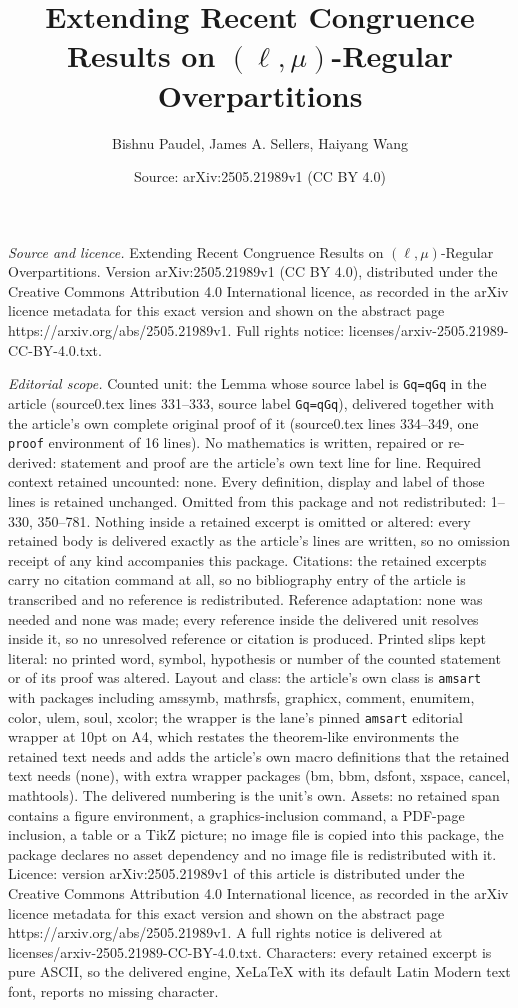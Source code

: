 \documentclass[10pt,a4paper]{amsart}
\title[Extending Recent Congruence Results on $(\ell,\mu)$-Regular ]{Extending Recent Congruence Results on $(\ell,\mu)$-Regular Overpartitions}
\author{Bishnu Paudel, James A. Sellers, Haiyang Wang}
\date{Source: arXiv:2505.21989v1 (CC BY 4.0)}
\begin{document}
\maketitle

\noindent\emph{Source and licence.} Extending Recent Congruence Results on $(\ell,\mu)$-Regular Overpartitions. Version arXiv:2505.21989v1 (CC BY 4.0), distributed under the Creative Commons Attribution 4.0 International licence, as recorded in the arXiv licence metadata for this exact version and shown on the abstract page https://arxiv.org/abs/2505.21989v1. Full rights notice: licenses/arxiv-2505.21989-CC-BY-4.0.txt.\par\smallskip

\noindent\textit{Editorial scope.} Counted unit: the Lemma whose source label is \texttt{Gq=qGq} in the article (source0.tex lines 331--333, source label \texttt{Gq=qGq}), delivered together with the article's own complete original proof of it (source0.tex lines 334--349, one \texttt{proof} environment of 16 lines). No mathematics is written, repaired or re-derived: statement and proof are the article's own text line for line. Required context retained uncounted: none. Every definition, display and label of those lines is retained unchanged. Omitted from this package and not redistributed: 1--330, 350--781. Nothing inside a retained excerpt is omitted or altered: every retained body is delivered exactly as the article's lines are written, so no omission receipt of any kind accompanies this package. Citations: the retained excerpts carry no citation command at all, so no bibliography entry of the article is transcribed and no reference is redistributed. Reference adaptation: none was needed and none was made; every reference inside the delivered unit resolves inside it, so no unresolved reference or citation is produced. Printed slips kept literal: no printed word, symbol, hypothesis or number of the counted statement or of its proof was altered. Layout and class: the article's own class is \texttt{amsart} with packages including amssymb, mathrsfs, graphicx, comment, enumitem, color, ulem, soul, xcolor; the wrapper is the lane's pinned \texttt{amsart} editorial wrapper at 10pt on A4, which restates the theorem-like environments the retained text needs and adds the article's own macro definitions that the retained text needs (none), with extra wrapper packages (bm, bbm, dsfont, xspace, cancel, mathtools). The delivered numbering is the unit's own. Assets: no retained span contains a figure environment, a graphics-inclusion command, a PDF-page inclusion, a table or a TikZ picture; no image file is copied into this package, the package declares no asset dependency and no image file is redistributed with it. Licence: version arXiv:2505.21989v1 of this article is distributed under the Creative Commons Attribution 4.0 International licence, as recorded in the arXiv licence metadata for this exact version and shown on the abstract page https://arxiv.org/abs/2505.21989v1. A full rights notice is delivered at licenses/arxiv-2505.21989-CC-BY-4.0.txt. Characters: every retained excerpt is pure ASCII, so the delivered engine, XeLaTeX with its default Latin Modern text font, reports no missing character.
\end{document}
